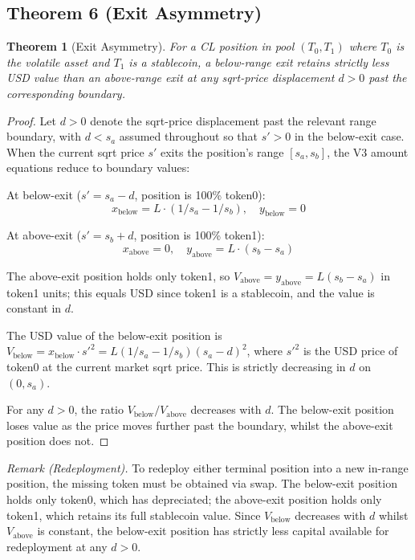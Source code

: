 \documentclass[11pt,a4paper]{article}
\newtheorem{theorem}{Theorem}
\theoremstyle{definition}
\begin{document}
\subsection{Theorem 6 (Exit Asymmetry)}

\begin{theorem}[Exit Asymmetry]
For a CL position in pool $(T_0, T_1)$ where $T_0$ is the volatile asset and $T_1$ is a stablecoin, a below-range exit retains strictly less USD value than an above-range exit at any sqrt-price displacement $d > 0$ past the corresponding boundary.
\end{theorem}

\begin{proof}
Let $d > 0$ denote the sqrt-price displacement past the relevant range boundary, with $d < s_a$ assumed throughout so that $s' > 0$ in the below-exit case. When the current sqrt price $s'$ exits the position's range $[s_a, s_b]$, the V3 amount equations reduce to boundary values:

At below-exit ($s' = s_a - d$, position is 100\% token0):
\begin{equation}
x_{\text{below}} = L \cdot (1/s_a - 1/s_b), \quad y_{\text{below}} = 0
\end{equation}

At above-exit ($s' = s_b + d$, position is 100\% token1):
\begin{equation}
x_{\text{above}} = 0, \quad y_{\text{above}} = L \cdot (s_b - s_a)
\end{equation}

The above-exit position holds only token1, so $V_{\text{above}} = y_{\text{above}} = L(s_b - s_a)$ in token1 units; this equals USD since token1 is a stablecoin, and the value is constant in $d$.

The USD value of the below-exit position is $V_{\text{below}} = x_{\text{below}} \cdot s'^2 = L(1/s_a - 1/s_b)(s_a - d)^2$, where $s'^2$ is the USD price of token0 at the current market sqrt price. This is strictly decreasing in $d$ on $(0, s_a)$.

For any $d > 0$, the ratio $V_{\text{below}}/V_{\text{above}}$ decreases with $d$. The below-exit position loses value as the price moves further past the boundary, whilst the above-exit position does not.
\end{proof}

\noindent\textit{Remark (Redeployment).} To redeploy either terminal position into a new in-range position, the missing token must be obtained via swap. The below-exit position holds only token0, which has depreciated; the above-exit position holds only token1, which retains its full stablecoin value. Since $V_{\text{below}}$ decreases with $d$ whilst $V_{\text{above}}$ is constant, the below-exit position has strictly less capital available for redeployment at any $d > 0$.
\end{document}
